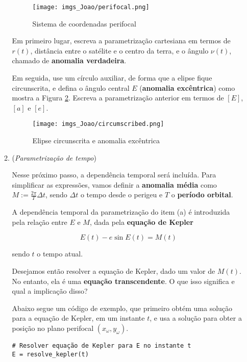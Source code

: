 \documentclass[9pt]{article}
\begin{document}
\begin{enumerate}[label=$\blacktriangleright$ {\bf Exercício \arabic*},series=exerc,align=left]
\begin{enumerate}[label=(\alph*)]
    \begin{figure}[H]
        \centering
        \texttt{[image: imgs\_Joao/perifocal.png]}
        \caption{Sistema de coordenadas perifocal}
        \label{fig:perifocal}
    \end{figure}

    Em primeiro lugar, escreva a parametrização cartesiana em termos de $r(t)$, distância entre o satélite e o centro da terra, e o ângulo $\nu(t)$, chamado de \textbf{anomalia verdadeira}.

    Em seguida, use um círculo auxiliar, de forma que a elipse fique circunscrita, e defina o ângulo central $E$ (\textbf{anomalia excêntrica}) como mostra a Figura \ref{fig:circumscribed}. Escreva a parametrização anterior em termos de $[E]$, $[a]$ e $[e]$.
    
    \begin{figure}[H]
        \centering
        \texttt{[image: imgs\_Joao/circumscribed.png]}
        \caption{Elipse circunscrita e anomalia excêntrica}
        \label{fig:circumscribed}
    \end{figure}

    \item (\textit{Parametrização de tempo})

    Nesse próximo passo, a dependência temporal será incluída. Para simplificar as expressões, vamos definir a \textbf{anomalia média} como $M := \frac{2\pi}{T}\Delta t$, sendo $\Delta t$ o tempo desde o perigeu e $T$ o \textbf{período orbital}. 
    
    A dependência temporal da parametrização do item (a) é introduzida pela relação entre $E$ e $M$, dada pela \textbf{equação de Kepler}

    $$E(t) - e \sin E(t) = M(t)$$

    sendo $t$ o tempo atual.

    Desejamos então resolver a equação de Kepler, dado um valor de $M(t)$. No entanto, ela é uma \textbf{equação transcendente}. O que isso significa e qual a implicação disso?

    Abaixo segue um código de exemplo, que primeiro obtém uma solução para a equação de Kepler, em um instante $t$, e usa a solução para obter a posição no plano perifocal $(x_\omega, y_\omega)$. 

    \begin{verbatim}
# Resolver equação de Kepler para E no instante t
E = resolve_kepler(t)


\end{verbatim}
\end{enumerate}
\end{enumerate}
\end{document}
